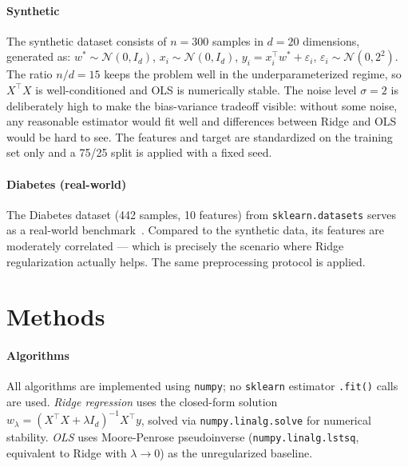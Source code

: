 \documentclass[11pt, a4paper, twoside]{article}
\begin{document}
\paragraph{Synthetic}
The synthetic dataset consists of $n = 300$ samples in $d = 20$ dimensions,
generated as:
$w^* \sim \mathcal{N}(0, I_d)$,\;
$x_i \sim \mathcal{N}(0, I_d)$,\;
$y_i = x_i^\top w^* + \varepsilon_i$,\; $\varepsilon_i \sim \mathcal{N}(0, 2^2)$.
The ratio $n/d = 15$ keeps the problem well in the underparameterized regime, so
$X^\top X$ is well-conditioned and OLS is numerically stable.
The noise level $\sigma = 2$ is deliberately high to make the bias-variance tradeoff
visible: without some noise, any reasonable estimator would fit well and differences
between Ridge and OLS would be hard to see.
The features and target are standardized on the training set only and a 75/25 split is
applied with a fixed seed.

\paragraph{Diabetes (real-world)}
The Diabetes dataset (442 samples, 10 features) from \texttt{sklearn.datasets} serves
as a real-world benchmark~\cite{efron2004}.
Compared to the synthetic data, its features are moderately correlated --- which is precisely the scenario where Ridge regularization actually helps.
The same preprocessing protocol is applied.

\section{Methods}

\paragraph{Algorithms}
All algorithms are implemented using \texttt{numpy}; no \texttt{sklearn}
estimator \texttt{.fit()} calls are used.
\emph{Ridge regression} uses the closed-form solution
$w_\lambda = (X^\top X + \lambda I_d)^{-1} X^\top y$,
solved via \texttt{numpy.\allowbreak linalg.\allowbreak solve} for numerical stability.
\emph{OLS} uses Moore-Penrose pseudoinverse
(\texttt{numpy.\allowbreak linalg.\allowbreak lstsq},
equivalent to Ridge with $\lambda \to 0$) as the unregularized baseline.
\end{document}

